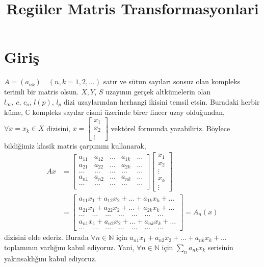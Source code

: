 



\title{Regüler Matris Transformasyonlari}
\maketitle

\tableofcontents

\newpage
\section*{Giriş}
\label{section-introduction}
$A=(a_{nk})\quad(n,k=1,2,\ldots)$ satır ve sütun sayıları sonsuz olan kompleks terimli bir matris olsun. $X,Y$, $S$ uzayının gerçek altkümelerin olan $l_\infty,\,c,\,c_o,\,l(p),\,l_p$ dizi uzaylarından herhangi ikisini temsil etsin. Buradaki herbir küme, $\mathbb{C}$ kompleks sayılar cismi üzerinde birer lineer uzay olduğundan, $\forall x=x_k\in X$ dizisini, $x=\begin{bmatrix}x_1\\x_2\\\vdots\end{bmatrix}$ vektörel formunda yazabiliriz. Böylece bildiğimiz klasik matris çarpımını kullanarak,
$$\begin{aligned}
Ax&=\begin{bmatrix}
a_{11} & a_{12} & \ldots & a_{1k} &\ldots\\
a_{21} & a_{22} & \ldots & a_{2k} &\ldots\\
\ldots & \ldots & \ldots & \ldots &\ldots\\
a_{n1} &a_{n2}  & \ldots & a_{nk} &\ldots\\
\ldots & \ldots & \ldots & \ldots &\ldots\\
\end{bmatrix}
\begin{bmatrix}
x_1 \\ x_2 \\ \vdots \\x_k\\ \vdots
\end{bmatrix}\\
&=\begin{bmatrix}
a_{11}x_1+ a_{12}x_2+ \ldots + a_{1k}x_k+\ldots\\
a_{21}x_1+ a_{22}x_2+ \ldots + a_{2k}x_k+\ldots\\
\ldots \quad\ldots\quad  \ldots\quad  \ldots \quad\ldots\quad\ldots\quad\ldots\\
a_{n1}x_1+a_{n2}x_2+ \ldots + a_{nk}x_k+\ldots\\
\ldots \quad\ldots\quad  \ldots\quad  \ldots \quad\ldots\quad\ldots\quad\ldots
\end{bmatrix}=A_n(x)
\end{aligned}$$
dizisini elde ederiz. Burada $\forall n\in \mathbb{N}$ için $a_{n1}x_1+a_{n2}x_2+\ldots+a_{nk}x_k+\ldots$ toplamının varlığını kabul ediyoruz. Yani, $\forall n\in \mathbb{N}$ için $\sum\limits_na_{nk}x_k$ serisinin yakınsaklığını kabul ediyoruz.

